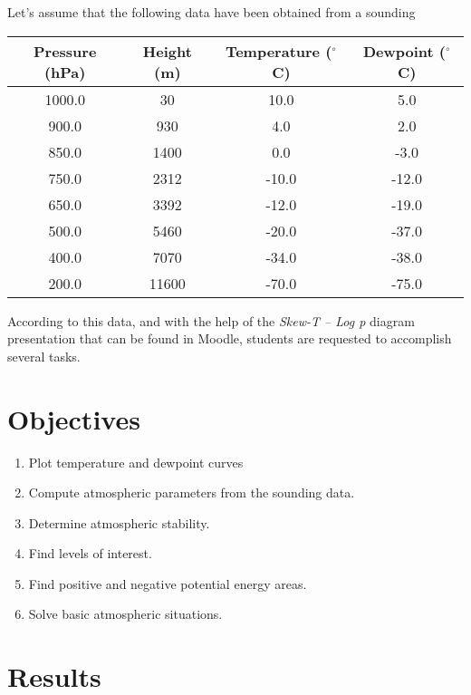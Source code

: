 \documentclass{article}
\begin{document}
Let's assume that the following data have been obtained from a sounding
\begin{center}
\begin{tabular}{|cccc|}
\hline
Pressure (hPa) &  Height (m) & Temperature ($^\circ$C) &Dewpoint ($^\circ$C)  \\
\hline
 1000.0       &  30         & 10.0         &  5.0  \\
  900.0       & 930         &  4.0         &  2.0  \\%
  850.0       &1400         &  0.0         & -3.0  \\%
  750.0       &2312         &-10.0         &-12.0  \\%
  650.0       &3392         &-12.0         &-19.0  \\%
  500.0       &5460         &-20.0         &-37.0  \\%
  400.0       &7070         &-34.0         &-38.0  \\%
  200.0       &11600        &-70.0         &-75.0  \\   
\hline
\end{tabular}
\end{center}

According to this data, and with the help of the \textit{Skew-T -- Log p}
diagram presentation that can
be found in Moodle, students are requested to accomplish several tasks.

\section{Objectives}

\begin{enumerate}
  \item Plot temperature and dewpoint curves
  \item Compute atmospheric parameters from the sounding data.
  \item Determine atmospheric stability.
  \item Find levels of interest.
  \item Find positive and negative potential energy areas.
  \item Solve basic atmospheric situations.
\end{enumerate}

\section{Results}
\end{document}
